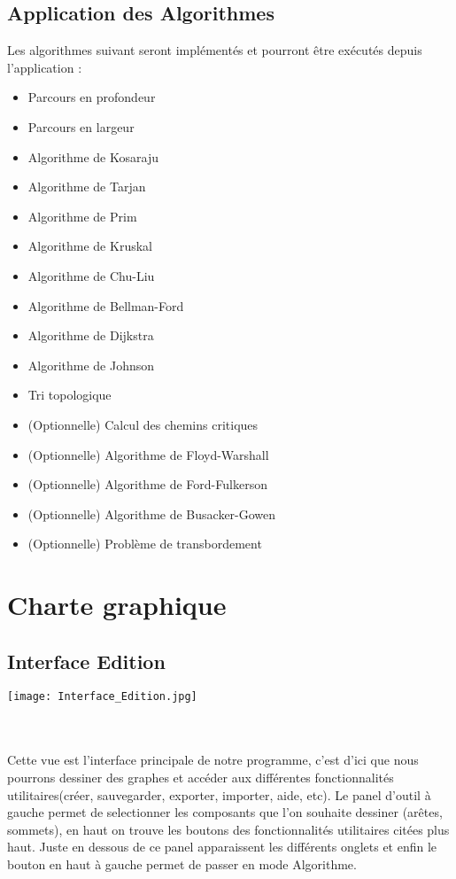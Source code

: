 \documentclass[french]{article}
\begin{document}
		\subsection{Application des Algorithmes}
			Les algorithmes suivant seront implémentés et pourront être exécutés depuis
      l'application :
			\begin{itemize}
				\item Parcours en profondeur
        \item Parcours en largeur
        \item Algorithme de Kosaraju
        \item Algorithme de Tarjan
        \item Algorithme de Prim
        \item Algorithme de Kruskal
        \item Algorithme de Chu-Liu
        \item Algorithme de Bellman-Ford
        \item Algorithme de Dijkstra
        \item Algorithme de Johnson
        \item Tri topologique
        \item (Optionnelle) Calcul des chemins critiques
        \item (Optionnelle) Algorithme de Floyd-Warshall
        \item (Optionnelle) Algorithme de Ford-Fulkerson
        \item (Optionnelle) Algorithme de Busacker-Gowen
				\item (Optionnelle) Problème de transbordement
			\end{itemize}

  \section{Charte graphique}
    \subsection{Interface Edition}
    \begin{minipage}{\linewidth}
    \center
       \texttt{[image: Interface\_Edition.jpg]}
    \end{minipage}
    \\
    \\
    Cette vue est l'interface principale de notre programme, c'est d'ici que nous pourrons dessiner des graphes et accéder aux différentes fonctionnalités utilitaires(créer, sauvegarder, exporter, importer, aide, etc).
    Le panel d'outil à gauche permet de selectionner les composants que l'on souhaite dessiner (arêtes, sommets), en haut on trouve les boutons des fonctionnalités utilitaires citées plus haut.
    Juste en dessous de ce panel apparaissent les différents onglets et enfin le bouton en haut à gauche permet de passer en mode Algorithme.
\end{document}
